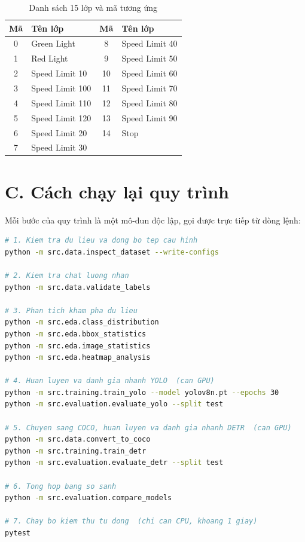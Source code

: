 \begin{table}[H]
\centering
\caption{Danh sách 15 lớp và mã tương ứng}
\label{tab:danhsachlop}
\small
\begin{tabular}{clcl}
\toprule
\textbf{Mã} & \textbf{Tên lớp} & \textbf{Mã} & \textbf{Tên lớp} \\
\midrule
0 & Green Light      & 8  & Speed Limit 40 \\
1 & Red Light        & 9  & Speed Limit 50 \\
2 & Speed Limit 10   & 10 & Speed Limit 60 \\
3 & Speed Limit 100  & 11 & Speed Limit 70 \\
4 & Speed Limit 110  & 12 & Speed Limit 80 \\
5 & Speed Limit 120  & 13 & Speed Limit 90 \\
6 & Speed Limit 20   & 14 & Stop \\
7 & Speed Limit 30   &    & \\
\bottomrule
\end{tabular}
\end{table}

\section*{C. Cách chạy lại quy trình}

Mỗi bước của quy trình là một mô-đun độc lập, gọi được trực tiếp từ dòng lệnh:

\begin{lstlisting}[language=bash, caption={Các lệnh chạy lại từng bước của quy trình}, label={lst:cmds}]
# 1. Kiem tra du lieu va dong bo tep cau hinh
python -m src.data.inspect_dataset --write-configs

# 2. Kiem tra chat luong nhan
python -m src.data.validate_labels

# 3. Phan tich kham pha du lieu
python -m src.eda.class_distribution
python -m src.eda.bbox_statistics
python -m src.eda.image_statistics
python -m src.eda.heatmap_analysis

# 4. Huan luyen va danh gia nhanh YOLO  (can GPU)
python -m src.training.train_yolo --model yolov8n.pt --epochs 30
python -m src.evaluation.evaluate_yolo --split test

# 5. Chuyen sang COCO, huan luyen va danh gia nhanh DETR  (can GPU)
python -m src.data.convert_to_coco
python -m src.training.train_detr
python -m src.evaluation.evaluate_detr --split test

# 6. Tong hop bang so sanh
python -m src.evaluation.compare_models

# 7. Chay bo kiem thu tu dong  (chi can CPU, khoang 1 giay)
pytest
\end{lstlisting}

